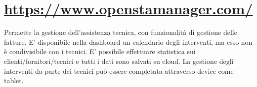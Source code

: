 \documentclass[11pt]{article}
\begin{document}
\section{\href{openStamanager}{https://www.openstamanager.com/}}
Permette la gestione dell'assistenza tecnica, con funzionalità di gestione delle fatture.
E' disponibile nella dashboard un calendario degli interventi, ma esso non è condivisibile con i tecnici.
E' possibile effettuare statistica sui clienti/fornitori/tecnici e tutti i dati sono salvati su cloud.
La gestione degli interventi da parte dei tecnici può essere completata attraverso device come tablet.
\end{document}
